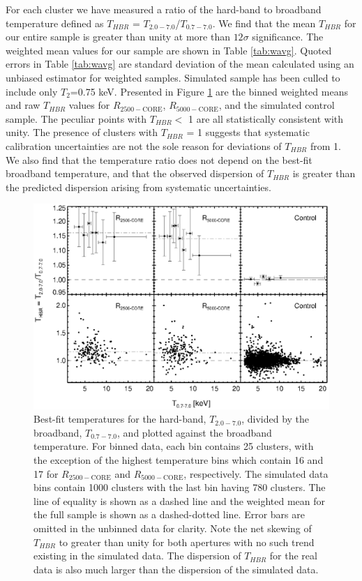 For each cluster we have measured a ratio of the hard-band to
broadband temperature defined as $T_{HBR}$ =
$T_{2.0-7.0}$/$T_{0.7-7.0}$. We find that the mean $T_{HBR}$ for our
entire sample is greater than unity at more than $12\sigma$
significance. The weighted mean values for our sample are shown in
Table \ref{tab:wavg}. Quoted errors in Table \ref{tab:wavg} are
standard deviation of the mean calculated using an unbiased estimator
for weighted samples. Simulated sample has been culled to include only
$T_2$=0.75 keV. Presented in Figure \ref{fig:ftx} are the binned
weighted means and raw $T_{HBR}$ values for $R_{2500-\mathrm{CORE}}$,
$R_{5000-\mathrm{CORE}}$, and the simulated control sample. The
peculiar points with $T_{HBR} <$ 1 are all statistically consistent
with unity. The presence of clusters with $T_{HBR}$ = 1 suggests that
systematic calibration uncertainties are not the sole reason for
deviations of $T_{HBR}$ from 1. We also find that the temperature
ratio does not depend on the best-fit broadband temperature, and that
the observed dispersion of $T_{HBR}$ is greater than the predicted
dispersion arising from systematic uncertainties.

\begin{figure}
\begin{center}
\includegraphics*[width=\textwidth, trim=0mm 0mm 0mm 0mm, clip]{eband_f3.eps}
\caption[$T_{HBR}$ vs. broadband temperature for $T_{HBR}$ sample]{
  Best-fit temperatures for the hard-band, $T_{2.0-7.0}$, divided by
  the broadband, $T_{0.7-7.0}$, and plotted against the broadband
  temperature. For binned data, each bin contains 25 clusters, with
  the exception of the highest temperature bins which contain 16 and
  17 for $R_{2500-\mathrm{CORE}}$ and $R_{5000-\mathrm{CORE}}$,
  respectively. The simulated data bins contain 1000 clusters with the
  last bin having 780 clusters. The line of equality is shown as a
  dashed line and the weighted mean for the full sample is shown as a
  dashed-dotted line. Error bars are omitted in the unbinned data for
  clarity. Note the net skewing of $T_{HBR}$ to greater than unity for
  both apertures with no such trend existing in the simulated
  data. The dispersion of $T_{HBR}$ for the real data is also much
  larger than the dispersion of the simulated data.  }
\label{fig:ftx}
\end{center}
\end{figure}

